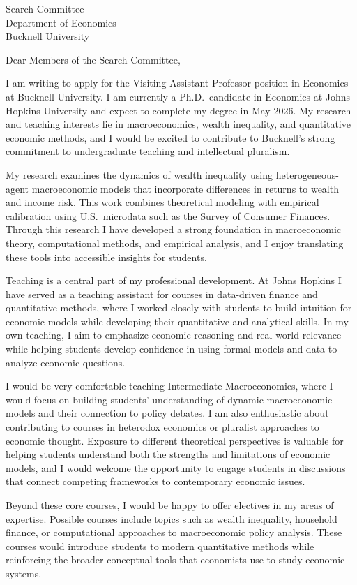 \documentclass[11pt]{letter}
\begin{document}
\begin{letter}{Search Committee \\
Department of Economics \\
Bucknell University}

\opening{Dear Members of the Search Committee,}

I am writing to apply for the Visiting Assistant Professor position in Economics at Bucknell University. I am currently a Ph.D.\ candidate in Economics at Johns Hopkins University and expect to complete my degree in May 2026. My research and teaching interests lie in macroeconomics, wealth inequality, and quantitative economic methods, and I would be excited to contribute to Bucknell’s strong commitment to undergraduate teaching and intellectual pluralism.

My research examines the dynamics of wealth inequality using heterogeneous-agent macroeconomic models that incorporate differences in returns to wealth and income risk. This work combines theoretical modeling with empirical calibration using U.S.\ microdata such as the Survey of Consumer Finances. Through this research I have developed a strong foundation in macroeconomic theory, computational methods, and empirical analysis, and I enjoy translating these tools into accessible insights for students.

Teaching is a central part of my professional development. At Johns Hopkins I have served as a teaching assistant for courses in data-driven finance and quantitative methods, where I worked closely with students to build intuition for economic models while developing their quantitative and analytical skills. In my own teaching, I aim to emphasize economic reasoning and real-world relevance while helping students develop confidence in using formal models and data to analyze economic questions.

I would be very comfortable teaching Intermediate Macroeconomics, where I would focus on building students’ understanding of dynamic macroeconomic models and their connection to policy debates. I am also enthusiastic about contributing to courses in heterodox economics or pluralist approaches to economic thought. Exposure to different theoretical perspectives is valuable for helping students understand both the strengths and limitations of economic models, and I would welcome the opportunity to engage students in discussions that connect competing frameworks to contemporary economic issues.

Beyond these core courses, I would be happy to offer electives in my areas of expertise. Possible courses include topics such as wealth inequality, household finance, or computational approaches to macroeconomic policy analysis. These courses would introduce students to modern quantitative methods while reinforcing the broader conceptual tools that economists use to study economic systems.


\end{letter}
\end{document}
